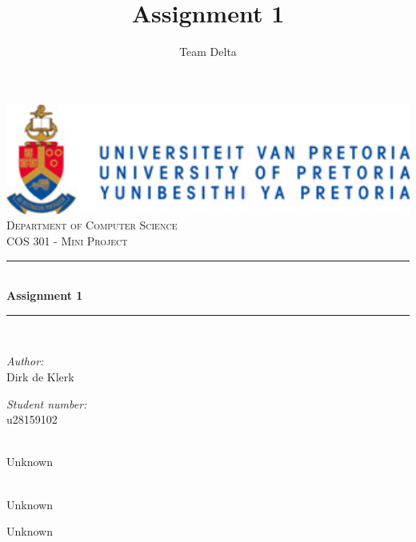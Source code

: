 \documentclass[a4paper,12pt]{report}
\author{Team Delta}
\title{ Assignment 1}
\newcommand{\HRule}{\rule{\linewidth}{0.5mm}}
\begin{document}
\setlength{\parskip}{6pt}

\begin{titlepage}

\begin{center}
\includegraphics[width=1\textwidth]{./up-logo.jpg}\\[0.4cm]    
\textsc{\LARGE Department of Computer Science}\\[1.5cm]
\textsc{\Large COS 301 - Mini Project}\\[0.5cm]
\HRule \\[0.4cm]
{ \huge \bfseries Assignment 1}\\[0.4cm]
\HRule \\[0.4cm]
\begin{minipage}{0.4\textwidth}
\begin{flushleft} \large
\emph{Author:}\\
Dirk {de Klerk}
\end{flushleft}
\end{minipage}
\begin{minipage}{0.4\textwidth}
\begin{flushright} \large
\emph{Student number:} \\
u28159102
\end{flushright}
\end{minipage}
\begin{minipage}{0.4\textwidth}
\begin{flushleft} \large
\emph{} \\
Unknown
\end{flushleft}
\end{minipage}
\begin{minipage}{0.4\textwidth}
\begin{flushright} \large
\emph{} \\
Unknown
\end{flushright}
\end{minipage}
\begin{minipage}{0.4\textwidth}
\begin{flushleft} \large
Unknown
\end{flushleft}

\end{minipage}
\end{center}
\end{titlepage}
\end{document}
